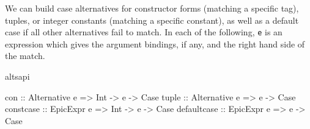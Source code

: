 
\noindent
We can build case alternatives for constructor forms (matching a
specific tag), tuples, or integer constants (matching a specific
constant), as well as a default case if all other alternatives fail to
match. In each of the following, \texttt{e} is an expression which
gives the argument bindings, if any, and the right hand side of the
match.


\begin{SaveVerbatim}{altsapi}

con         :: Alternative e => Int -> e -> Case
tuple       :: Alternative e =>        e -> Case
constcase   :: EpicExpr e    => Int -> e -> Case
defaultcase :: EpicExpr e    =>        e -> Case

\end{SaveVerbatim}

